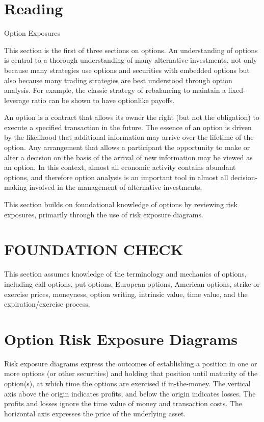 \documentclass[11pt]{article}
\begin{document}
\section*{Reading}
Option Exposures

This section is the first of three sections on options. An understanding of options is central to a thorough understanding of many alternative investments, not only because many strategies use options and securities with embedded options but also because many trading strategies are best understood through option analysis. For example, the classic strategy of rebalancing to maintain a fixed-leverage ratio can be shown to have optionlike payoffs.

An option is a contract that allows its owner the right (but not the obligation) to execute a specified transaction in the future. The essence of an option is driven by the likelihood that additional information may arrive over the lifetime of the option. Any arrangement that allows a participant the opportunity to make or alter a decision on the basis of the arrival of new information may be viewed as an option. In this context, almost all economic activity contains abundant options, and therefore option analysis is an important tool in almost all decision-making involved in the management of alternative investments.

This section builds on foundational knowledge of options by reviewing risk exposures, primarily through the use of risk exposure diagrams.

\section*{FOUNDATION CHECK}
This section assumes knowledge of the terminology and mechanics of options, including call options, put options, European options, American options, strike or exercise prices, moneyness, option writing, intrinsic value, time value, and the expiration/exercise process.

\section*{Option Risk Exposure Diagrams}
Risk exposure diagrams express the outcomes of establishing a position in one or more options (or other securities) and holding that position until maturity of the option(s), at which time the options are exercised if in-the-money. The vertical axis above the origin indicates profits, and below the origin indicates losses. The profits and losses ignore the time value of money and transaction costs. The horizontal axis expresses the price of the underlying asset.
\end{document}

